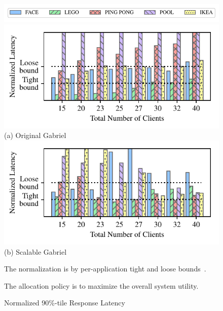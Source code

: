 \begin{figure}[]
  \begin{center}
    \includegraphics[width=\linewidth]{FIGS/fig-alloc-latency-legend.pdf}
    \includegraphics[width=\linewidth]{FIGS/fig-alloc-latency-baseline.pdf}
    {(a) Original Gabriel}
    \includegraphics[width=\linewidth]{FIGS/fig-alloc-latency-cpushares.pdf}
    {(b) Scalable Gabriel}
  \end{center}
  \begin{captiontext}
    \centering
    The normalization is  by per-application tight and loose
    bounds~\cite{chen2017empirical}.

    The allocation policy is to maximize the overall system utility.
  \end{captiontext}
  \caption{Normalized 90\%-tile Response Latency}
  \label{fig:alloc-latency}
\end{figure}


